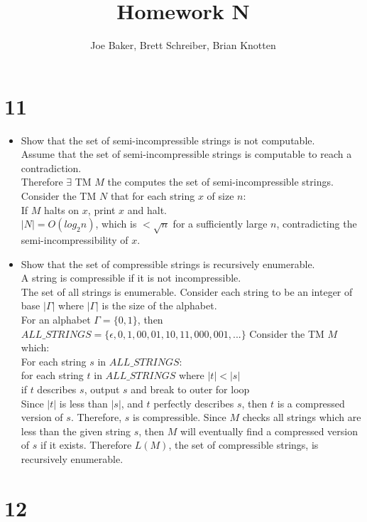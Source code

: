 \documentclass[letterpaper,notitlepage,twoside]{article}
\newcommand\tab[1][1cm]{\hspace*{#1}} %
\begin{document}
\title{Homework N}
\author{Joe Baker, Brett Schreiber, Brian Knotten}
\maketitle

\section*{11}
\begin{itemize}

\item Show that the set of semi-incompressible strings is not computable. \\
Assume that the set of semi-incompressible strings is computable to reach a contradiction. \\
Therefore $\exists$ TM $M$ the computes the set of semi-incompressible strings. \\
Consider the TM $N$ that for each string $x$ of size $n$: \\
\tab If $M$ halts on $x$, print $x$ and halt. \\
$|N| = O(log_{2} n)$, which is $< \sqrt{n}$ for a sufficiently large $n$, contradicting the semi-incompressibility of $x$.\\

\item Show that the set of compressible strings is recursively enumerable.\\
A string is compressible if it is not incompressible.\\
The set of all strings is enumerable. Consider each string to be an integer of base $|\Gamma|$ where $|\Gamma|$ is the size of the alphabet. \\
For an alphabet $\Gamma = \{0, 1\}$, then $ALL\_STRINGS = \{\epsilon, 0, 1, 00, 01, 10, 11, 000, 001,...\}$
Consider the TM $M$ which: \\
For each string $s$ in $ALL\_STRINGS$: \\
	\tab for each string $t$ in $ALL\_STRINGS$ where $|t| < |s|$ \\
		\tab\tab if $t$ describes $s$, output $s$ and break to outer for loop \\		
Since $|t|$ is less than $|s|$, and $t$ perfectly describes $s$, then $t$ is a compressed version of $s$. Therefore, $s$ is compressible. Since $M$ checks all strings which are less than the given string $s$, then $M$ will eventually find a compressed version of $s$ if it exists. Therefore $L(M)$, the set of compressible strings, is recursively enumerable.


\end{itemize}
\section*{12}
\end{document}
